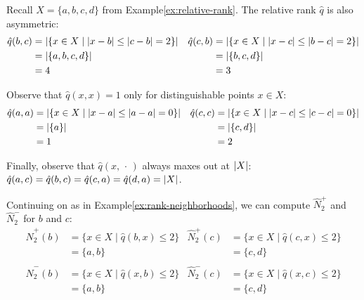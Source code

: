 \documentclass[
]{article}
\begin{document}
\begin{example}\label{ex:relative-rank-max}

Recall $X=\{a,b,c,d\}$ from Example\nbs\ref{ex:relative-rank}. The relative rank $\hat{q}$ is also asymmetric:
\begin{align*}
    \hat{q}(b,c) &= \lvert \{x \in X \mid \lvert x-b\rvert \leq \lvert c-b\rvert = 2\}\rvert &
    \hat{q}(c,b) &= \lvert \{x \in X \mid \lvert x-c\rvert \leq \lvert b-c\rvert = 2\}\rvert \\
        &= \lvert \{a, b, c, d\}\rvert &&= \lvert \{b, c, d\}\rvert \\
        &= 4 &&= 3
\end{align*}

Observe that $\hat{q}(x,x) = 1$ only for distinguishable points $x \in X$:
\begin{align*}
    \hat{q}(a,a) &= \lvert \{x \in X \mid \lvert x-a\rvert \leq \lvert a-a\rvert = 0\}\rvert &
    \hat{q}(c,c) &= \lvert \{x \in X \mid \lvert x-c\rvert \leq \lvert c-c\rvert = 0\}\rvert \\
       &= \lvert \{a\}\rvert &&= \lvert \{c, d\}\rvert \\
       &= 1 &&= 2
\end{align*}

Finally, observe that $\hat{q}(x,\,\cdot\,)$ always maxes out at $\lvert X\rvert$: $\hat{q}(a,c) = \hat{q}(b,c) = \hat{q}(c,a) = \hat{q}(d,a) = \lvert X\rvert$.

Continuing on as in Example\nbs\ref{ex:rank-neighborhoods}, we can compute $\hat{N}_2^+$ and $\hat{N}_2^-$ for $b$ and $c$:
\begin{align*}
    \hat{N}_2^+ (b) &= \{x \in X \mid \hat{q}(b,x) \leq 2\} &
    \hat{N}_2^+ (c) &= \{x \in X \mid \hat{q}(c,x) \leq 2\} \\
        &= \{a, b\} &&= \{c, d\} \\
        \\
    \hat{N}_2^- (b) &= \{x \in X \mid \hat{q}(x,b) \leq 2\} &
    \hat{N}_2^- (c) &= \{x \in X \mid \hat{q}(x,c) \leq 2\} \\
        &= \{a, b\} &&= \{c, d\}
\end{align*}


\end{example}
\end{document}
